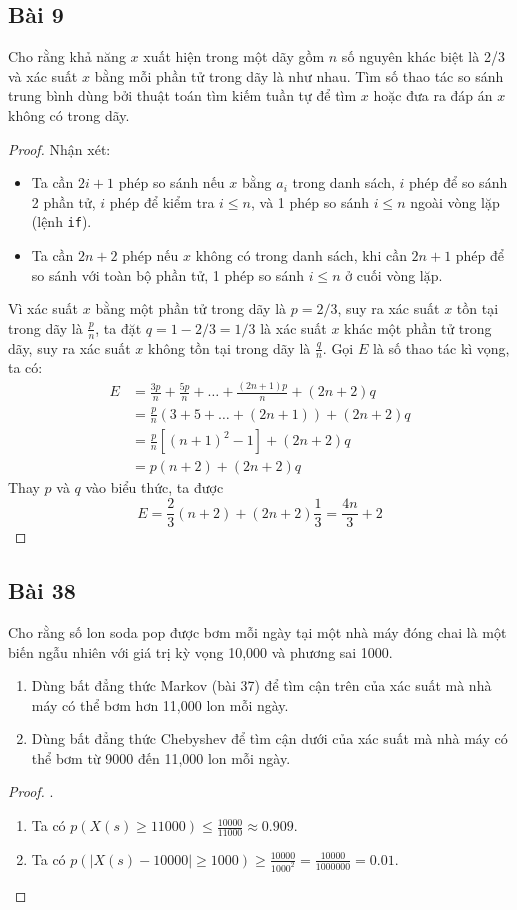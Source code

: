 \subsection*{Bài 9}
Cho rằng khả năng $x$ xuất hiện trong một dãy gồm $n$ số nguyên khác biệt là 2/3 và xác suất $x$ bằng mỗi phần tử trong dãy là như nhau. Tìm số thao tác so sánh trung bình dùng bởi thuật toán tìm kiếm tuần tự để tìm $x$ hoặc đưa ra đáp án $x$ không có trong dãy.
\begin{proof}
    Nhận xét:
    \begin{itemize}
        \item Ta cần $2i+1$ phép so sánh nếu $x$ bằng $a_i$ trong danh sách, $i$ phép để so sánh 2 phần tử, $i$ phép để kiểm tra $i\leq n$, và 1 phép so sánh $i\leq n$ ngoài vòng lặp (lệnh \texttt{if}).
        \item Ta cần $2n+2$ phép nếu $x$ không có trong danh sách, khi cần $2n+1$ phép để so sánh với toàn bộ phần tử, 1 phép so sánh $i\leq n$ ở cuối vòng lặp.
    \end{itemize}
    Vì xác suất $x$ bằng một phần tử trong dãy là $p=2/3$, suy ra xác suất $x$ tồn tại trong dãy là $\frac{p}{n}$, ta đặt $q=1-2/3=1/3$ là xác suất $x$ khác một phần tử trong dãy, suy ra xác suất $x$ không tồn tại trong dãy là $\frac{q}{n}$. Gọi $E$ là số thao tác kì vọng, ta có:
    \begin{align*}
        E&=\frac{3p}{n}+\frac{5p}{n}+\dots+\frac{(2n+1)p}{n}+(2n+2)q\\
        &=\frac{p}{n}(3+5+\dots+(2n+1))+(2n+2)q\\
        &=\frac{p}{n}[(n+1)^2-1]+(2n+2)q\\
        &=p(n+2)+(2n+2)q
    \end{align*}
    Thay $p$ và $q$ vào biểu thức, ta được $$E=\frac{2}{3}(n+2)+(2n+2)\frac{1}{3}=\frac{4n}{3}+2$$
\end{proof}
\subsection*{Bài 38}
Cho rằng số lon soda pop được bơm mỗi ngày tại một nhà máy đóng chai là một biến ngẫu nhiên với giá trị kỳ vọng 10,000 và phương sai 1000.
\begin{enumerate}[label=\alph*)]
    \item Dùng bất đẳng thức Markov (bài 37) để tìm cận trên của xác suất mà nhà máy có thể bơm hơn 11,000 lon mỗi ngày.
    \item Dùng bất đẳng thức Chebyshev để tìm cận dưới của xác suất mà nhà máy có thể bơm từ 9000 đến 11,000 lon mỗi ngày.
\end{enumerate}
\begin{proof}.
    \begin{enumerate}[label=\alph*)]
        \item Ta có $p(X(s)\geq 11000)\leq\frac{10000}{11000}\approx0.909$.
        \item Ta có $p(|X(s)-10000|\geq 1000)\geq\frac{10000}{1000^2}=\frac{10000}{1000000}=0.01$.
    \end{enumerate}
\end{proof}